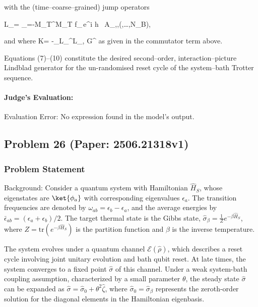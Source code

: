 \documentclass[10pt]{article}
\begin{document}
with the (time–coarse–grained) jump operators

\displaystyle
\hat L_{\mu}= \delta\sum_{\tau=-M_T}^{M_T}
                 f_{\tau}\,e^{i h \delta \tau}\,
                 \tilde A_{\mu,\tau}\;,\qquad(,\dots,N_B),

and where  
        \hat K= -\sum_{\mu}\hat L_\mu^\dagger\hat L_\mu ,  
        \hat G^{} as given in the commutator term above.

Equations (7)–(10) constitute the desired second–order,
interaction–picture Lindblad generator for the un-randomised reset
cycle of the system–bath Trotter sequence.

\paragraph*{Judge's Evaluation:}

Evaluation Error: No \boxed{} expression found in the model's output.

\newpage
\subsection*{Problem 26 (Paper: 2506.21318v1)}
\subsubsection*{Problem Statement}
Background:
Consider a quantum system with Hamiltonian $\hat H_S$, whose eigenstates are $\ket{\phi_a}$ with corresponding eigenvalues $\epsilon_a$. The transition frequencies are denoted by $\omega_{ab} = \epsilon_b - \epsilon_a$, and the average energies by $\bar{\epsilon}_{ab} = (\epsilon_a + \epsilon_b)/2$. The target thermal state is the Gibbs state, $\hat\sigma_\beta = \frac{1}{Z}e^{-\beta \hat H_S}$, where $Z = \text{tr}(e^{-\beta \hat H_S})$ is the partition function and $\beta$ is the inverse temperature.

The system evolves under a quantum channel $\mathcal{E}(\hat\rho)$, which describes a reset cycle involving joint unitary evolution and bath qubit reset. At late times, the system converges to a fixed point $\hat\sigma$ of this channel. Under a weak system-bath coupling assumption, characterized by a small parameter $\theta$, the steady state $\hat\sigma$ can be expanded as $\hat\sigma = \hat\sigma_0 + \theta^2 \hat\zeta$, where $\hat\sigma_0 = \hat\sigma_\beta$ represents the zeroth-order solution for the diagonal elements in the Hamiltonian eigenbasis.
\end{document}
